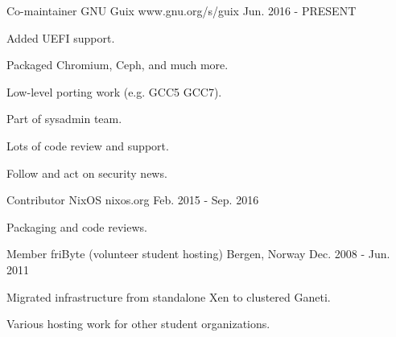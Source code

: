 

\begin{cventries}
  \cventry
    {Co-maintainer} %
    {GNU Guix} %
    {www.gnu.org/s/guix} %
    {Jun. 2016 - PRESENT} %
    {
      \begin{cvitems} %
        \item {Added UEFI support.}
        \item {Packaged Chromium, Ceph, and much more.}
        \item {Low-level porting work (e.g. GCC5 \textrightarrow{} GCC7).}
        \item {Part of sysadmin team.}
        \item {Lots of code review and support.}
        \item {Follow and act on security news.}
      \end{cvitems}
    }

  \cventry
    {Contributor} %
    {NixOS} %
    {nixos.org} %
    {Feb. 2015 - Sep. 2016} %
    {
      \begin{cvitems} %
        \item {Packaging and code reviews.}
      \end{cvitems}
    }

  \cventry
    {Member} %
    {friByte (volunteer student hosting)} %
    {Bergen, Norway} %
    {Dec. 2008 - Jun. 2011} %
    {
      \begin{cvitems} %
        \item {Migrated infrastructure from standalone Xen to clustered Ganeti.}
        \item {Various hosting work for other student organizations.}
      \end{cvitems}
    }
\end{cventries}
